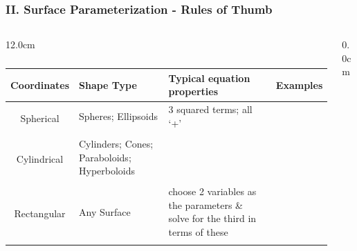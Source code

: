 \begin{frame}
\frametitle{II. Surface Parameterization - Rules of Thumb }
\scriptsize
\begin{columns}
\begin{column}{12.0cm}

\begin{table}
	\setlength{\extrarowheight}{0.2cm}
	\begin{tabular}{| c | p{1.8cm} | p{3.0cm} | p{2.5cm} |}
		\hline
		{\bf Coordinates} & {\bf Shape Type} & {\bf Typical equation properties} & {\bf Examples}\\
		\hline
		\multirow{2}{*}{Spherical} & Spheres; \hspace{1.0cm} Ellipsoids & 3 squared terms; all `+' & \\
		& & & \\
		\hline
		\multirow{2}{*}{Cylindrical} & Cylinders; Cones; Paraboloids; Hyperboloids &  & \\
		& & & \\
		\hline
		\multirow{2}{*}{Rectangular} & Any Surface & choose 2 variables as the parameters \& solve for the third in terms of these & \\
		& & & \\
		\hline
	\end{tabular}
	\label{}
	\caption{}
\end{table}

\end{column}
\begin{column}{0.0cm}\end{column}
\end{columns}
\end{frame}

